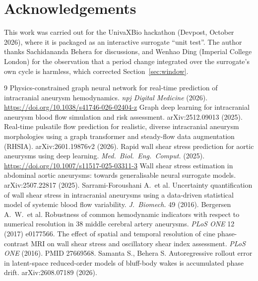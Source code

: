 \documentclass[11pt,a4paper]{article}
\begin{document}
\section*{Acknowledgements}
This work was carried out for the UnivaXBio hackathon (Devpost, October
2026), where it is packaged as an interactive surrogate ``unit test''.
The author thanks Sachidananda Behera for discussions, and Wenhao Ding
(Imperial College London) for the observation that a period change integrated
over the surrogate's own cycle is harmless, which corrected
Section~\ref{sec:window}.

\begin{thebibliography}{9}
 Physics-constrained graph neural network for real-time
prediction of intracranial aneurysm hemodynamics. \emph{npj Digital Medicine}
(2026). \url{https://doi.org/10.1038/s41746-026-02404-z}
 Graph deep learning for intracranial aneurysm blood
flow simulation and risk assessment. arXiv:2512.09013 (2025).
 Real-time pulsatile flow prediction for realistic,
diverse intracranial aneurysm morphologies using a graph transformer and
steady-flow data augmentation (RHSIA). arXiv:2601.19876v2 (2026).
 Rapid wall shear stress prediction for aortic aneurysms
using deep learning. \emph{Med.\ Biol.\ Eng.\ Comput.} (2025).
\url{https://doi.org/10.1007/s11517-025-03311-3}
 Wall shear stress estimation in abdominal aortic aneurysms:
towards generalisable neural surrogate models. arXiv:2507.22817 (2025).
 Sarrami-Foroushani A.\ et al. Uncertainty
quantification of wall shear stress in intracranial aneurysms using a
data-driven statistical model of systemic blood flow variability.
\emph{J.\ Biomech.} 49 (2016).
 Bergersen A.\ W.\ et al. Robustness of common
hemodynamic indicators with respect to numerical resolution in 38 middle
cerebral artery aneurysms. \emph{PLoS ONE} 12 (2017) e0177566.
 The effect of spatial and temporal resolution of cine
phase-contrast MRI on wall shear stress and oscillatory shear index
assessment. \emph{PLoS ONE} (2016). PMID 27669568.
 Samanta S., Behera S. Autoregressive rollout error in
latent-space reduced-order models of bluff-body wakes is accumulated phase
drift. arXiv:2608.07189 (2026).
\end{thebibliography}
\end{document}
